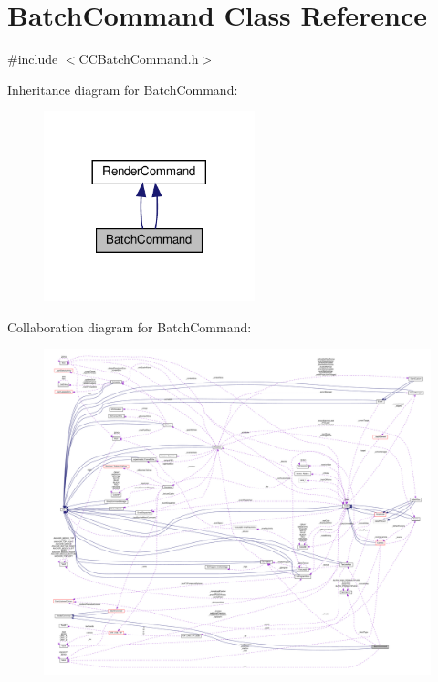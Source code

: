 \hypertarget{classBatchCommand}{}\section{Batch\+Command Class Reference}
\label{classBatchCommand}


{\ttfamily \#include $<$C\+C\+Batch\+Command.\+h$>$}



Inheritance diagram for Batch\+Command\+:
\nopagebreak
\begin{figure}[H]
\begin{center}
\leavevmode
\includegraphics[width=173pt]{classBatchCommand__inherit__graph}
\end{center}
\end{figure}


Collaboration diagram for Batch\+Command\+:
\nopagebreak
\begin{figure}[H]
\begin{center}
\leavevmode
\includegraphics[width=350pt]{classBatchCommand__coll__graph}
\end{center}
\end{figure}
